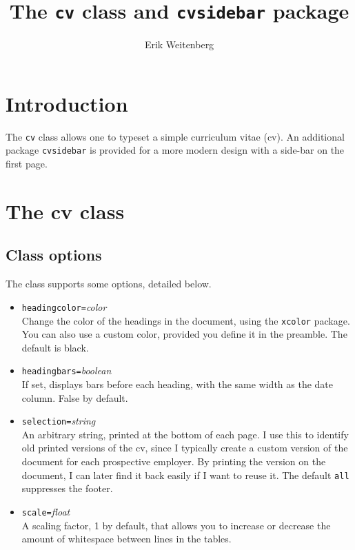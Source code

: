 \documentclass{article}
\title{The \texttt{cv} class and \texttt{cvsidebar} package}
\author{Erik Weitenberg}
\begin{document}
\maketitle

\section{Introduction}
The \texttt{cv} class allows one to typeset a simple curriculum vitae (cv).
An additional package \texttt{cvsidebar} is provided for a more modern design with a side-bar on the first page.

\section{The cv class}
\subsection{Class options}
The class supports some options, detailed below.
\begin{itemize}
	\item \texttt{headingcolor=}\textit{color} \\
		Change the color of the headings in the document, using the \texttt{xcolor} package.
		You can also use a custom color, provided you define it in the preamble.
		The default is black.
	\item \texttt{headingbars=}\textit{boolean} \\
		If set, displays bars before each heading, with the same width as the date column.
		False by default.
	\item \texttt{selection=}\textit{string} \\
		An arbitrary string, printed at the bottom of each page.
		I use this to identify old printed versions of the cv, since I typically create a custom version of the document for each prospective employer.
		By printing the version on the document, I can later find it back easily if I want to reuse it.
		The default \texttt{all} suppresses the footer.
	\item \texttt{scale=}\textit{float} \\
		A scaling factor, 1 by default, that allows you to increase or decrease the amount of whitespace between lines in the tables.
\end{itemize}
\end{document}
